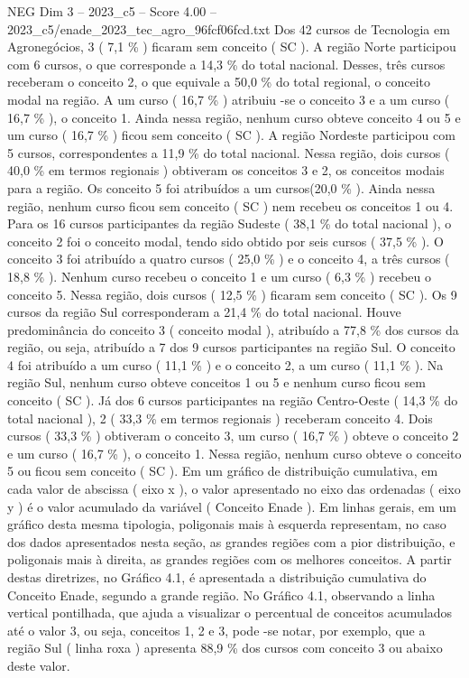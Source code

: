 \begin{textsample}{NEG Dim 3 – 2023\_c5 – Score 4.00 – 2023\_c5/enade\_2023\_tec\_agro\_96fcf06fcd.txt}
Dos 42 cursos de Tecnologia em Agronegócios, 3 ( 7,1 \% ) ficaram sem conceito ( SC ).
A região Norte participou com 6 cursos, o que corresponde a 14,3 \% do total nacional.
Desses, três cursos receberam o conceito 2, o que equivale a 50,0 \% do total regional, o conceito modal na região.
A um curso ( 16,7 \% ) atribuiu -se o conceito 3 e a um curso ( 16,7 \% ), o conceito 1.
Ainda nessa região, nenhum curso obteve conceito 4 ou 5 e um curso ( 16,7 \% ) ficou sem conceito ( SC ).
A região Nordeste participou com 5 cursos, correspondentes a 11,9 \% do total nacional.
Nessa região, dois cursos ( 40,0 \% em termos regionais ) obtiveram os conceitos 3 e 2, os conceitos modais para a região.
Os conceito 5 foi atribuídos a um cursos(20,0 \% ).
Ainda nessa região, nenhum curso ficou sem conceito ( SC ) nem recebeu os conceitos 1 ou 4.
Para os 16 cursos participantes da região Sudeste ( 38,1 \% do total nacional ), o conceito 2 foi o conceito modal, tendo sido obtido por seis cursos ( 37,5 \% ).
O conceito 3 foi atribuído a quatro cursos ( 25,0 \% ) e o conceito 4, a três cursos ( 18,8 \% ).
Nenhum curso recebeu o conceito 1 e um curso ( 6,3 \% ) recebeu o conceito 5.
Nessa região, dois cursos ( 12,5 \% ) ficaram sem conceito ( SC ).
Os 9 cursos da região Sul corresponderam a 21,4 \% do total nacional.
Houve predominância do conceito 3 ( conceito modal ), atribuído a 77,8 \% dos cursos da região, ou seja, atribuído a 7 dos 9 cursos participantes na região Sul.
O conceito 4 foi atribuído a um curso ( 11,1 \% ) e o conceito 2, a um curso ( 11,1 \% ).
Na região Sul, nenhum curso obteve conceitos 1 ou 5 e nenhum curso ficou sem conceito ( SC ).
Já dos 6 cursos participantes na região Centro-Oeste ( 14,3 \% do total nacional ), 2 ( 33,3 \% em termos regionais ) receberam conceito 4.
Dois cursos ( 33,3 \% ) obtiveram o conceito 3, um curso ( 16,7 \% ) obteve o conceito 2 e um curso ( 16,7 \% ), o conceito 1.
Nessa região, nenhum curso obteve o conceito 5 ou ficou sem conceito ( SC ).
Em um gráfico de distribuição cumulativa, em cada valor de abscissa ( eixo x ), o valor apresentado no eixo das ordenadas ( eixo y ) é o valor acumulado da variável ( Conceito Enade ).
Em linhas gerais, em um gráfico desta mesma tipologia, poligonais mais à esquerda representam, no caso dos dados apresentados nesta seção, as grandes regiões com a pior distribuição, e poligonais mais à direita, as grandes regiões com os melhores conceitos.
A partir destas diretrizes, no Gráfico 4.1, é apresentada a distribuição cumulativa do Conceito Enade, segundo a grande região.
No Gráfico 4.1, observando a linha vertical pontilhada, que ajuda a visualizar o percentual de conceitos acumulados até o valor 3, ou seja, conceitos 1, 2 e 3, pode -se notar, por exemplo, que a região Sul ( linha roxa ) apresenta 88,9 \% dos cursos com conceito 3 ou abaixo deste valor.

\end{textsample}
